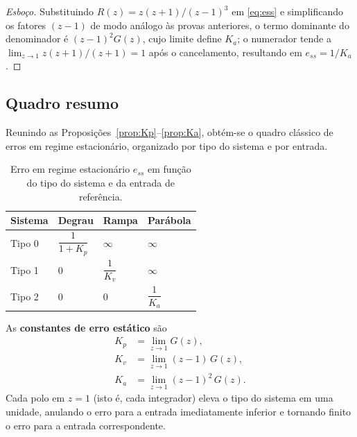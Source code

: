 \documentclass[11pt,a4paper,oneside]{book}
\theoremstyle{definition}
\theoremstyle{plain}
\begin{document}
\begin{proof}[Esboço]
Substituindo $R(z)=z(z+1)/(z-1)^3$ em \eqref{eq:ess} e simplificando os fatores
$(z-1)$ de modo análogo às provas anteriores, o termo dominante do denominador é
$(z-1)^2 G(z)$, cujo limite define $K_a$; o numerador tende a
$\lim_{z\to1}z(z+1)/(z+1)=1$ após o cancelamento, resultando em $e_{ss}=1/K_a$.
\end{proof}

\subsection{Quadro resumo}

Reunindo as Proposições~\ref{prop:Kp}--\ref{prop:Ka}, obtém-se o quadro clássico
de erros em regime estacionário, organizado por tipo do sistema e por entrada.

\begin{table}[H]
    \centering
    \renewcommand{\arraystretch}{1.7}
    \begin{tabular}{>{\centering\arraybackslash}m{2.6cm}
                    >{\centering\arraybackslash}m{2.6cm}
                    >{\centering\arraybackslash}m{2.6cm}
                    >{\centering\arraybackslash}m{2.6cm}}
        \toprule
        \rowcolor{corbox}
        \textbf{Sistema} & \textbf{Degrau} & \textbf{Rampa} & \textbf{Parábola}\\
        \midrule
        Tipo 0 & $\dfrac{1}{1+K_p}$ & $\infty$ & $\infty$\\
        Tipo 1 & $0$ & $\dfrac{1}{K_v}$ & $\infty$\\
        Tipo 2 & $0$ & $0$ & $\dfrac{1}{K_a}$\\
        \bottomrule
    \end{tabular}
    \caption[Erros em regime estacionário]{Erro em regime estacionário
    $e_{ss}$ em função do tipo do sistema e da entrada de referência.}
    \label{tab:erros}
\end{table}

\begin{destaque}
As \textbf{constantes de erro estático} são
\begin{align*}
    K_p&=\lim_{z\to 1}G(z),\\
    K_v&=\lim_{z\to 1}(z-1)\,G(z),\\
    K_a&=\lim_{z\to 1}(z-1)^2\,G(z).
\end{align*}
Cada polo em $z=1$ (isto é, cada integrador) eleva o tipo do sistema em uma
unidade, anulando o erro para a entrada imediatamente inferior e tornando finito
o erro para a entrada correspondente.
\end{destaque}
\end{document}
